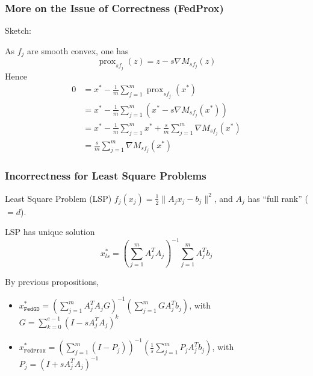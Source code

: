 
\begin{frame}
\frametitle{More on the Issue of Correctness (FedProx)}

Sketch:

As $f_j$ are smooth convex, one has
$$\operatorname{prox}_{sf_j}(z) = z - s\nabla M_{sf_j}(z)$$
Hence
{\smaller
\begin{align*}
0 & = x^* - \frac{1}{m}\sum_{j=1}^m \operatorname{prox}_{sf_j}(x^*) \\
& = x^* - \frac{1}{m}\sum_{j=1}^m \left( x^* - s\nabla M_{sf_j}(x^*) \right) \\
& = x^* - \frac{1}{m}\sum_{j=1}^m x^* + \frac{s}{m}\sum_{j=1}^m\nabla M_{sf_j}(x^*) \\
& = \frac{s}{m}\sum_{j=1}^m\nabla M_{sf_j}(x^*)
\end{align*}
}

\end{frame}


\begin{frame}
\frametitle{Incorrectness for Least Square Problems}

\begin{block}{Least Square Problem (LSP)}
$f_j(x_j) = \frac12 \lVert A_jx_j-b_j \rVert^2$, and $A_j$ has ``full rank'' ($=d$).
\end{block}

LSP has unique solution
{\smaller
$$x^*_{ls} = \left( \sum_{j=1}^m A_j^TA_j \right)^{-1} \sum_{j=1}^m A_j^Tb_j$$
}

\pause

By previous propositions,
\begin{itemize}
    \item {\smaller$x^*_{\texttt{FedGD}} = \left( \sum\limits_{j=1}^m A_j^TA_j G \right)^{-1}\left( \sum\limits_{j=1}^m GA_j^Tb_j \right)$, with $G = \sum\limits_{k=0}^{e-1}(I-sA_j^TA_j)^k$}
    \item {\smaller$x^*_{\texttt{FedProx}} = \left( \sum\limits_{j=1}^m \left( I - P_j \right) \right)^{-1}\left( \frac{1}{s}\sum\limits_{j=1}^m P_jA_j^Tb_j \right)$, with $P_j = (I+sA_j^TA_j)^{-1}$}
\end{itemize}

\end{frame}


